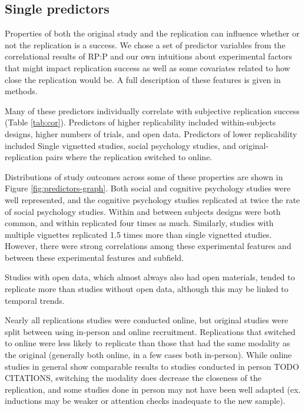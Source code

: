 \documentclass[
  english,
  a4paper,
]{article}
\begin{document}
\hypertarget{single-predictors}{%
\subsection{Single predictors}\label{single-predictors}}

Properties of both the original study and the replication can influence whether or not the replication is a success. We chose a set of predictor variables from the correlational results of RP:P and our own intuitions about experimental factors that might impact replication success as well as some covariates related to how close the replication would be. A full description of these features is given in methods.

Many of these predictors individually correlate with subjective replication success (Table \ref{tab:cor}). Predictors of higher replicability included within-subjects designs, higher numbers of trials, and open data. Predictors of lower replicability included Single vignetted studies, social psychology studies, and original-replication pairs where the replication switched to online.

Distributions of study outcomes across some of these properties are shown in Figure \ref{fig:predictors-graph}. Both social and cognitive psychology studies were well represented, and the cognitive psychology studies replicated at twice the rate of social psychology studies. Within and between subjects designs were both common, and within replicated four times as much. Similarly, studies with multiple vignettes replicated 1.5 times more than single vignetted studies. However, there were strong correlations among these experimental features and between these experimental features and subfield.

Studies with open data, which almost always also had open materials, tended to replicate more than studies without open data, although this may be linked to temporal trends.

Nearly all replications studies were conducted online, but original studies were split between using in-person and online recruitment. Replications that switched to online were less likely to replicate than those that had the same modality as the original (generally both online, in a few cases both in-person). While online studies in general show comparable results to studies conducted in person TODO CITATIONS, switching the modality does decrease the closeness of the replication, and some studies done in person may not have been well adapted (ex. inductions may be weaker or attention checks inadequate to the new sample).
\end{document}

